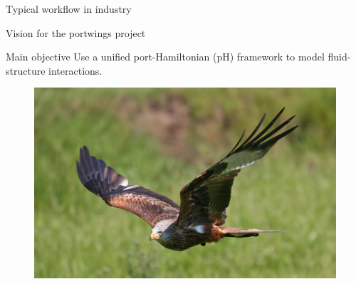 \documentclass[aspectratio=169]{beamer}
\begin{document}
\begin{frame}{Typical workflow in industry}
\begin{itemize}
\begin{figure}[t]
\begin{subfigure}[t]{0.4\textwidth}
				\end{subfigure}
			\end{figure}
		\end{itemize}
	\end{frame}
	
	
	\begin{frame}{Vision for the portwings project}
		
		\begin{block}{Main objective}
			Use a unified port-Hamiltonian (pH) framework to model fluid-structure interactions.
		\end{block}
		
		
		\begin{figure}[t]
				\includegraphics[width=.5\columnwidth]{Flying_Falcon.jpg}\\
		\end{figure}
		
		
	\end{frame}
	
\end{document}
